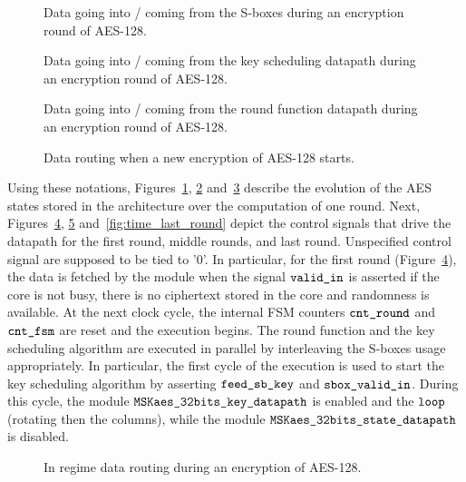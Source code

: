 \documentclass{scrartcl}
\begin{document}
\begin{figure}
    \centering
    
    \caption{Data going into / coming from the S-boxes during an encryption round of AES-128.}
    \label{fig:pipe_sbox}
\end{figure}


\begin{figure}
    \centering
    
    \caption{Data going into / coming from the key scheduling datapath during an encryption round of AES-128.}
    \label{fig:pipe_dpkey}
\end{figure}

\begin{figure}
    \centering
    
    \caption{Data going into / coming from the round function datapath during an encryption round of AES-128.}
    \label{fig:pipe_dpstate}
\end{figure}


\begin{figure}
    \centering
     
    \caption{Data routing when a new encryption of AES-128 starts.}
    \label{fig:time_first_round}
\end{figure}

Using these notations, Figures~\ref{fig:pipe_sbox}, \ref{fig:pipe_dpkey}
and~\ref{fig:pipe_dpstate} describe the evolution of the AES states stored in
the architecture over the computation of one round.
Next, Figures~\ref{fig:time_first_round}, \ref{fig:time_regime}
and~\ref{fig:time_last_round} depict the control signals that drive the
datapath for the first round, middle rounds, and last round. Unspecified control signal are supposed to be tied to '0'.
In particular, for the first round (Figure~\ref{fig:time_first_round}), the
data is fetched by the module when the signal $\texttt{valid\_in}$ is asserted if
the core is not busy, there is no ciphertext stored in the core and randomness
is available.
At the next clock cycle, the
internal FSM counters $\texttt{cnt\_round}$ and $\texttt{cnt\_fsm}$ are reset and the
execution begins. The round function and the key scheduling algorithm are
executed in parallel by interleaving the S-boxes usage appropriately. In
particular, the first cycle of the execution is used to start the key
scheduling algorithm by asserting $\texttt{feed\_sb\_key}$ and $\texttt{sbox\_valid\_in}$.
During this cycle, the module $\texttt{MSKaes\_32bits\_key\_datapath}$ is enabled and the
$\texttt{loop}$ (rotating then the columns), while the module $\texttt{MSKaes\_32bits\_state\_datapath}$
is disabled.
\begin{figure}
    \centering
     
    \caption{In regime data routing during an encryption of AES-128.}
    \label{fig:time_regime}
\end{figure}
\end{document}
